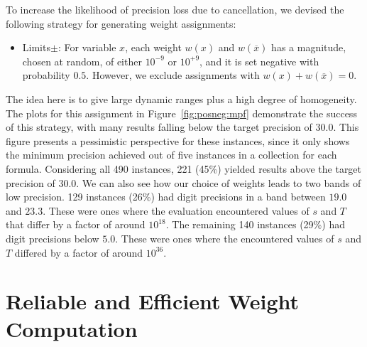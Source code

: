 \documentclass[letterpaper,USenglish,cleveref, autoref, thm-restate]{lipics-v2021}
\newcommand{\obar}[1]{\overline{#1}}
\begin{document}
To increase the likelihood of precision loss due to cancellation, we devised the following strategy for generating weight assignments:
\begin{itemize}
\item\textsf{Limits$\pm$}:  For variable $x$, each weight $w(x)$ and $w(\obar{x})$ has a magnitude, chosen at random, of either $10^{-9}$ or $10^{+9}$, and it is set negative with probability $0.5$.
  However, we exclude assignments with $w(x) + w(\obar{x}) = 0$.
\end{itemize}
The idea here is to give large dynamic ranges plus a high degree of
homogeneity.  The plots for this assignment in
Figure~\ref{fig:posneg:mpf} demonstrate the success of this strategy,
with many results falling below the target precision of $30.0$.
This figure
 presents a pessimistic
perspective for these instances, since it only shows the minimum
precision achieved out of five instances in a collection for each formula.  Considering all 490
instances,
221 (45\%) yielded results above the
target precision of $30.0$.  We can also see how our choice of weights
leads to two bands of low precision.  129 instances (26\%) had digit
precisions in a band between $19.0$ and $23.3$.  These were ones where
the evaluation encountered values of $s$ and $T$ that
differ by a factor of around $10^{18}$.  The remaining 140 instances
(29\%) had digit precisions below $5.0$.  These were ones where the
encountered values of $s$ and $T$ differed by a factor of around
 $10^{36}$.

\section{Reliable and Efficient Weight Computation}
\label{sect:reliable}
\end{document}
